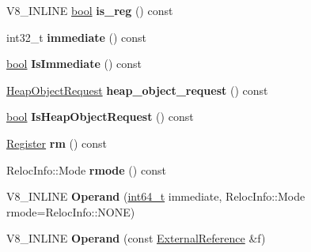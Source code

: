 \begin{DoxyCompactItemize}
\item 
\mbox{\label{classv8_1_1internal_1_1Operand_ac88d4705afba9fa8171c85bc2e38d3f2}} 
V8\+\_\+\+I\+N\+L\+I\+NE \mbox{\hyperlink{classbool}{bool}} {\bfseries is\+\_\+reg} () const
\item 
\mbox{\label{classv8_1_1internal_1_1Operand_a9dd1c171305a3bf1a9c61cc837a4f477}} 
int32\+\_\+t {\bfseries immediate} () const
\item 
\mbox{\label{classv8_1_1internal_1_1Operand_a8da286359e60a5ab8ba6e368fdca7d8b}} 
\mbox{\hyperlink{classbool}{bool}} {\bfseries Is\+Immediate} () const
\item 
\mbox{\label{classv8_1_1internal_1_1Operand_a9beaf04cfc4aea3a9d725172753766ed}} 
\mbox{\hyperlink{classv8_1_1internal_1_1HeapObjectRequest}{Heap\+Object\+Request}} {\bfseries heap\+\_\+object\+\_\+request} () const
\item 
\mbox{\label{classv8_1_1internal_1_1Operand_adc7ce8d04bde8ab9674a1bdc9689e5ee}} 
\mbox{\hyperlink{classbool}{bool}} {\bfseries Is\+Heap\+Object\+Request} () const
\item 
\mbox{\label{classv8_1_1internal_1_1Operand_ad0495c31017fd74b04574225b3af4d39}} 
\mbox{\hyperlink{classv8_1_1internal_1_1Register}{Register}} {\bfseries rm} () const
\item 
\mbox{\label{classv8_1_1internal_1_1Operand_a426ed4df4a3c04c315a06be3fe26fc3a}} 
Reloc\+Info\+::\+Mode {\bfseries rmode} () const
\item 
\mbox{\label{classv8_1_1internal_1_1Operand_a1ab13f06cfdce53181905475b667f48d}} 
V8\+\_\+\+I\+N\+L\+I\+NE {\bfseries Operand} (\mbox{\hyperlink{classint64__t}{int64\+\_\+t}} immediate, Reloc\+Info\+::\+Mode rmode=Reloc\+Info\+::\+N\+O\+NE)
\item 
\mbox{\label{classv8_1_1internal_1_1Operand_a538d1dcaf002542b9144b5fbc062d728}} 
V8\+\_\+\+I\+N\+L\+I\+NE {\bfseries Operand} (const \mbox{\hyperlink{classv8_1_1internal_1_1ExternalReference}{External\+Reference}} \&f)

\end{DoxyCompactItemize}
